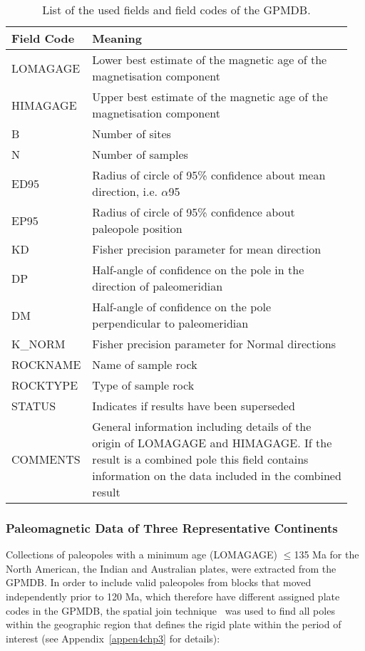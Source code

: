 \begin{table}
\centering
\caption{List of the used fields and field codes of the GPMDB.}\label{tab-fld}
\begin{tabular}{p{0.16\linewidth} p{0.79\linewidth}}
\toprule
Field Code & Meaning \\ \midrule
LOMAGAGE & Lower best estimate of the magnetic age of the magnetisation component \\
HIMAGAGE & Upper best estimate of the magnetic age of the magnetisation component \\
B & Number of sites \\
N & Number of samples \\
ED95 & Radius of circle of 95\% confidence about mean direction, i.e. $\alpha$95 \\
EP95 & Radius of circle of 95\% confidence about paleopole position \\
KD & Fisher precision parameter for mean direction \\
DP & Half-angle of confidence on the pole in the direction of paleomeridian \\
DM & Half-angle of confidence on the pole perpendicular to paleomeridian \\
K\_NORM & Fisher precision parameter for Normal directions \\
ROCKNAME & Name of sample rock \\
ROCKTYPE & Type of sample rock \\
STATUS & Indicates if results have been superseded \\
COMMENTS & General information including details of the origin of LOMAGAGE and
           HIMAGAGE\@. If the result is a combined pole this field contains information on the data included in the combined result \\
\bottomrule
\end{tabular}
\end{table}

\subsubsection{Paleomagnetic Data of Three Representative Continents}

Collections of paleopoles with a minimum age (LOMAGAGE) $\leq$135 Ma for the
North American, the Indian and Australian
plates, were extracted from the GPMDB\@. In order to include valid paleopoles
from blocks that moved independently prior to 120 Ma, which therefore have
different assigned plate codes in the GPMDB, the spatial join
technique~\citep{J07} was used to find all poles within the geographic region
that defines the rigid plate within the period of interest (see
Appendix~\ref{appen4chp3} for details):

